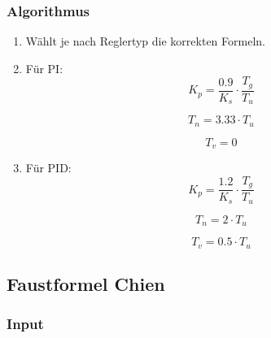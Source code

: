 \subsubsection*{Algorithmus}
\begin{enumerate}
    \item
        W\"ahlt je nach Reglertyp die korrekten Formeln.
    \item
        F\"ur PI:
        \begin{equation*}
            K_p= \frac{0.9}{K_s} \cdot \frac{T_g}{T_u}
        \end{equation*}

        \begin{equation*}
            T_n=3.33 \cdot T_u
        \end{equation*}

        \begin{equation*}
            T_v=0
        \end{equation*}
    \item
        F\"ur PID:
        \begin{equation*}
            K_p = \frac{1.2}{K_s} \cdot \frac{T_g}{T_u}
        \end{equation*}

        \begin{equation*}
            T_n=2 \cdot T_u
        \end{equation*}

        \begin{equation*}
            T_v = 0.5 \cdot T_u
        \end{equation*}
\end{enumerate}

%

\clearpage
\subsection{Faustformel Chien}
\label{app:algo:chien}

\subsubsection*{Input}

